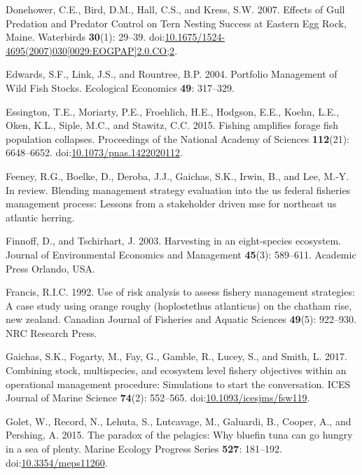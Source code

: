 \documentclass[]{article}
\begin{document}
\hypertarget{ref-donehower_effects_2007}{}
Donehower, C.E., Bird, D.M., Hall, C.S., and Kress, S.W. 2007. Effects
of Gull Predation and Predator Control on Tern Nesting Success at
Eastern Egg Rock, Maine. Waterbirds \textbf{30}(1): 29--39.
doi:\href{https://doi.org/10.1675/1524-4695(2007)030\%5B0029:EOGPAP\%5D2.0.CO;2}{10.1675/1524-4695(2007)030{[}0029:EOGPAP{]}2.0.CO;2}.

\hypertarget{ref-Edwards2004PortfolioStocks}{}
Edwards, S.F., Link, J.S., and Rountree, B.P. 2004. Portfolio Management
of Wild Fish Stocks. Ecological Economics \textbf{49}: 317--329.

\hypertarget{ref-essington_fishing_2015}{}
Essington, T.E., Moriarty, P.E., Froehlich, H.E., Hodgson, E.E., Koehn,
L.E., Oken, K.L., Siple, M.C., and Stawitz, C.C. 2015. Fishing amplifies
forage fish population collapses. Proceedings of the National Academy of
Sciences \textbf{112}(21): 6648--6652.
doi:\href{https://doi.org/10.1073/pnas.1422020112}{10.1073/pnas.1422020112}.

\hypertarget{ref-Feeney2018blending}{}
Feeney, R.G., Boelke, D., Deroba, J.J., Gaichas, S.K., Irwin, B., and
Lee, M.-Y. In review. Blending management strategy evaluation into the
us federal fisheries management process: Lessons from a stakeholder
driven mse for northeast us atlantic herring.

\hypertarget{ref-Finnoff2003HarvestingEcosystem}{}
Finnoff, D., and Tschirhart, J. 2003. Harvesting in an eight-species
ecosystem. Journal of Environmental Economics and Management
\textbf{45}(3): 589--611. Academic Press Orlando, USA.

\hypertarget{ref-francis1992use}{}
Francis, R.I.C. 1992. Use of risk analysis to assess fishery management
strategies: A case study using orange roughy (hoplostethus atlanticus)
on the chatham rise, new zealand. Canadian Journal of Fisheries and
Aquatic Sciences \textbf{49}(5): 922--930. NRC Research Press.

\hypertarget{ref-gaichas_combining_2017}{}
Gaichas, S.K., Fogarty, M., Fay, G., Gamble, R., Lucey, S., and Smith,
L. 2017. Combining stock, multispecies, and ecosystem level fishery
objectives within an operational management procedure: Simulations to
start the conversation. ICES Journal of Marine Science \textbf{74}(2):
552--565.
doi:\href{https://doi.org/10.1093/icesjms/fsw119}{10.1093/icesjms/fsw119}.

\hypertarget{ref-golet_paradox_2015}{}
Golet, W., Record, N., Lehuta, S., Lutcavage, M., Galuardi, B., Cooper,
A., and Pershing, A. 2015. The paradox of the pelagics: Why bluefin tuna
can go hungry in a sea of plenty. Marine Ecology Progress Series
\textbf{527}: 181--192.
doi:\href{https://doi.org/10.3354/meps11260}{10.3354/meps11260}.
\end{document}
